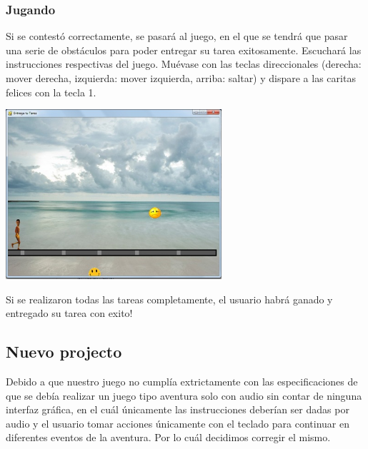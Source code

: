 \documentclass[12pt]{article}
\begin{document}
{{{\begin{flushleft}
\subsubsection{Jugando}
\vspace{0.1in}
Si se contestó correctamente, se pasará al juego, en el que se tendrá que pasar una serie de obstáculos para poder entregar su tarea exitosamente.
Escuchará las instrucciones respectivas del juego.
Muévase con las teclas direccionales (derecha: mover derecha, izquierda: mover izquierda, arriba: saltar) y dispare a las caritas felices con la tecla 1.
\vspace{0.4in}
	\begin{center}
		\begingroup
			\includegraphics[width=0.6\textwidth]{imagenes_usuario/juego1.jpg}
		\endgroup
	\end{center}
\vspace{0.3in}
Si se realizaron todas las tareas completamente, el usuario habrá ganado y entregado su tarea con exito!
\newpage
\subsection{Nuevo projecto}
\vspace{0.1in}
Debido a que nuestro juego no cumplía extrictamente con las especificaciones de que se debía realizar un juego tipo aventura solo con audio sin contar de ninguna interfaz gráfica, en el cuál únicamente las instrucciones deberían ser dadas por audio y el usuario tomar acciones únicamente con el teclado para continuar en diferentes eventos de la aventura. Por lo cuál decidimos corregir el mismo.


\end{flushleft}}}}
\end{document}
